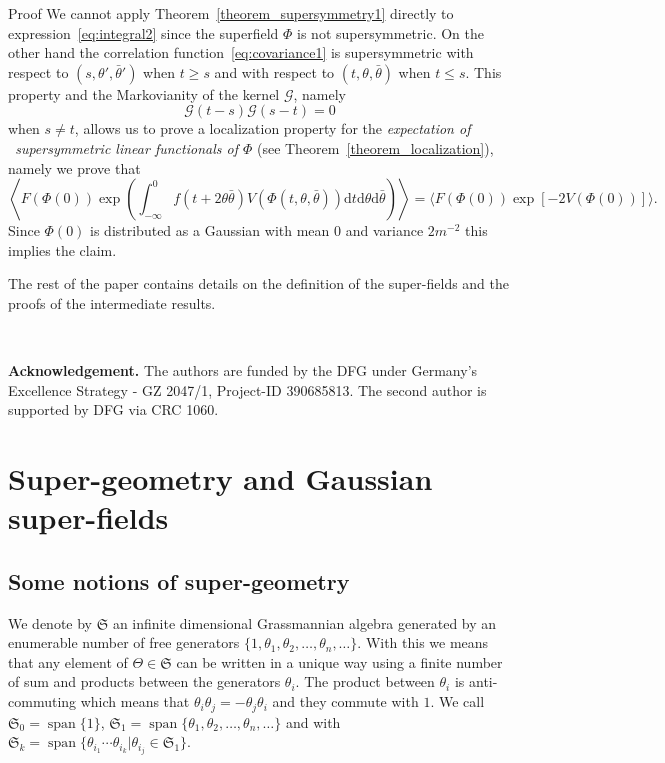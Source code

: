 \documentclass[a4paper,10pt]{article}
\newcommand{\mathd}{\mathrm{d}}
\newcommand{\tmop}[1]{\ensuremath{\operatorname{#1}}}
\newcommand{\tmtextbf}[1]{{\bfseries{#1}}}
\newcommand{\tmtextit}[1]{{\itshape{#1}}}
\newenvironment{proof*}[1]{\noindent\textbf{#1\ }}{\hspace*{\fill}$\Box$\medskip}
\begin{document}
\begin{proof*}{Proof}
  We cannot apply Theorem~\ref{theorem_supersymmetry1} directly to
  expression~{\eqref{eq:integral2}} since the superfield $\Phi$ is not
  supersymmetric. On the other hand the correlation
  function~{\eqref{eq:covariance1}} is supersymmetric with respect to $(s,
  \theta', \bar{\theta}')$ when $t \geqslant s$ and with respect to $(t,
  \theta, \bar{\theta})$ when $t \leqslant s$. This property and the
  Markovianity of the kernel $\mathcal{G}$, namely
  \[ \mathcal{G} (t - s) \mathcal{G} (s - t) = 0 \]
  when $s \not = t$, allows us to prove a localization property for the
  \tmtextit{expectation of \ supersymmetric linear functionals of $\Phi$} (see
  Theorem~\ref{theorem_localization}), namely we prove that
  \[ \left\langle F (\Phi (0)) \exp \left( \int_{- \infty}^0 f (t + 2 \theta
     \bar{\theta}) V (\Phi (t, \theta, \bar{\theta})) \mathd t \mathd \theta
     \mathd \bar{\theta} \right) \right\rangle = \langle F (\Phi (0)) \exp [-
     2 V (\Phi (0))] \rangle . \]
  Since $\Phi (0)$ is distributed as a Gaussian with mean $0$ and variance $2
  m^{- 2}$ this implies the claim.
\end{proof*}

The rest of the paper contains details on the definition of the super-fields
and the proofs of the intermediate results.

\

\tmtextbf{Acknowledgement.} The authors are funded by the DFG under Germany's Excellence Strategy - GZ 2047/1, Project-ID 390685813.  The second author is supported by DFG via CRC 1060.

\section{Super-geometry and Gaussian super-fields}\label{sec:supersymm}

\subsection{Some notions of super-geometry}

We denote by $\mathfrak{S}$ an infinite dimensional Grassmannian algebra
generated by an enumerable number of free generators $\{ 1, \theta_1,
\theta_2, \ldots, \theta_n, \ldots \}$. With this we means that any element of
$\Theta \in \mathfrak{S}$ can be written in a unique way using a finite number
of sum and products between the generators $\theta_i$. The product between
$\theta_i$ is anti-commuting which means that $\theta_i \theta_j = - \theta_j
\theta_i$ and they commute with $1$. We call $\mathfrak{S}_0 = \tmop{span} \{
1 \}$, $\mathfrak{S}_1 = \tmop{span} \{ \theta_1, \theta_2, \ldots, \theta_n,
\ldots \}$ and with $\mathfrak{S}_k = \tmop{span} \{ \theta_{i_1} \cdots
\theta_{i_k} | \theta_{i_j} \in \mathfrak{S}_1 \}$.
\end{document}
